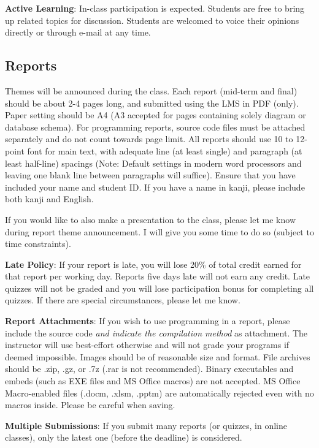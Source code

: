 \documentclass{article}
\begin{document}
\smallskip\noindent
\textbf{Active Learning}: In-class participation is expected. Students are free to bring up related topics for discussion. Students are welcomed to voice their opinions directly or through e-mail at any time.

\subsection{Reports}

Themes will be announced during the class. Each report (mid-term and final) should be about 2-4 pages long, and submitted using the LMS in PDF (only). Paper setting should be A4 (A3 accepted for pages containing solely diagram or database schema). For programming reports, source code files must be attached separately and do not count towards page limit. All reports should use 10 to 12-point font for main text, with adequate line (at least single) and paragraph (at least half-line) spacings (Note: Default settings in modern word processors and leaving one blank line between paragraphs will suffice). Ensure that you have included your name and student ID. If you have a name in kanji, please include both kanji and English.

If you would like to also make a presentation to the class, please let me know during report theme announcement. I will give you some time to do so (subject to time constraints).

\smallskip\noindent
\textbf{Late Policy}: If your report is late, you will lose 20\% of total credit earned for that report per working day. Reports five days late will not earn any credit. Late quizzes will not be graded and you will lose participation bonus for completing all quizzes. If there are special circumstances, please let me know.

\smallskip\noindent
\textbf{Report Attachments}: If you wish to use programming in a report, please include the source code \textit{and indicate the compilation method} as attachment. The instructor will use best-effort otherwise and will not grade your programs if deemed impossible. Images should be of reasonable size and format. File archives should be .zip, .gz, or .7z (.rar is not recommended). Binary executables and embeds (such as EXE files and MS Office macros) are not accepted. MS Office Macro-enabled files (.docm, .xlsm, .pptm) are automatically rejected even with no macros inside. Please be careful when saving.

\smallskip\noindent
\textbf{Multiple Submissions}: If you submit many reports (or quizzes, in online classes), only the latest one (before the deadline) is considered.
\end{document}
